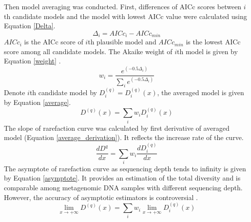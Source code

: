\documentclass[11pt]{article}
\begin{document}
      Then model averaging was conducted. First, differences of AICc scores between $i$th candidate models and the model with lowest AICc value were calculated using Equation \ref{Delta}.
      \begin{equation}
        \Delta_i = AICc_i-AICc_{min}
        \label{Delta}
      \end{equation}
      $AICc_i$ is the AICc score of $i$th plausible model and $AICc_{min}$ is the lowest AICc score among all candidate models. 
      The Akaike weight of $i$th model is given by Equation \ref{weight} \citep{anderson2007model}.
      \begin{equation}
        w_i = \frac{e^{(-0.5\Delta_i)}}{\sum_{i}e^{(-0.5\Delta_i)}}
        \label{weight}
      \end{equation}
      Denote $i$th candidate model by $D^{(q)}_i = D^{(q)}_i(x)$, the averaged model is given by Equation \ref{average}.
      \begin{equation}
        D^{(q)}(x) = \sum_{i}w_iD^{(q)}_i(x)
        \label{average}
      \end{equation}
      The slope of rarefaction curve was calculated by first derivative of averaged model (Equation \ref{average_derivation}). 
      It reflects the increase rate of the curve.
      \begin{equation}
        \frac{dD^{q}}{dx} = \sum_{i}w_i\frac{dD^{(q)}_i}{dx}
        \label{average_derivation}
      \end{equation}
      The asymptote of rarefaction curve as sequencing depth tends to infinity is given by Equation \ref{asymptote}. 
      It provides an estimation of the total diversity and is comparable among metagenomic DNA samples with different sequencing depth. 
      However, the accuracy of asymptotic estimators is controversial \citep{colwell1994estimating,chazdon1998statistical,jimenez2006comparing,hortal2006evaluating}.
      \begin{equation}
        \lim_{x \to +\infty}D^{(q)}(x) = \sum_{i}w_i\lim_{x \to +\infty}D^{(q)}_i(x)
        \label{asymptote}
      \end{equation}
\end{document}
